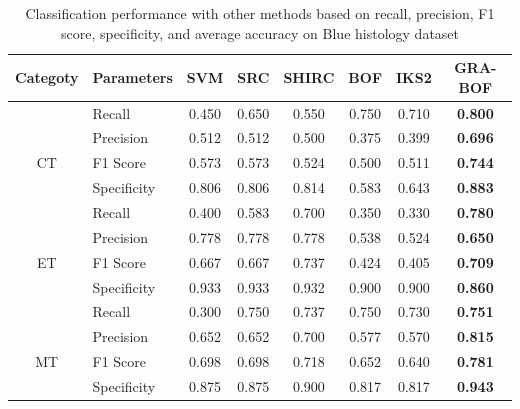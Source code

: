 \begin{table}[h]
\centering
\caption[Classification performance  with  other methods based on  recall, precision, F1 score, specificity, and average accuracy on Blue histology dataset]{\fontsize{10pt}{12pt}\selectfont Classification performance  with  other methods based on  recall, precision, F1 score, specificity, and average accuracy on Blue histology dataset}
    \label{ch5:tab:tissuep}
{\scriptsize
\renewcommand{\arraystretch}{1.2} 
\begin{tabular}{|c|l|c|c|c|c|c|c|}
\hline
Categoty    &    Parameters    &    SVM    &    SRC    &    SHIRC    &    BOF    &    IKS2    &    GRA-BOF    \\
\hline
    &    Recall    &    0.450    &    0.650    &    0.550    &    0.750    &    0.710    &    \textbf{0.800    }\\
    &    Precision    &    0.512    &    0.512    &    0.500    &    0.375    &    0.399    &    \textbf{0.696}    \\
CT    &    F1 Score     &    0.573    &    0.573    &    0.524    &    0.500    &    0.511    &    \textbf{0.744    }\\
    &    Specificity    &    0.806    &    0.806    &    0.814    &    0.583    &    0.643    &    \textbf{0.883    }\\
    \hline
    &    Recall    &    0.400    &    0.583    &    0.700    &    0.350    &    0.330    &    \textbf{0.780    }\\
    &    Precision    &    0.778    &    0.778    &    0.778    &    0.538    &    0.524    &    \textbf{0.650    }\\
ET    &    F1 Score     &    0.667    &    0.667    &    0.737    &    0.424    &    0.405    &\textbf{    0.709    }\\
    &    Specificity    &    0.933    &    0.933    &    0.932    &    0.900    &    0.900    &    \textbf{0.860}    \\
    \hline
    &    Recall    &    0.300    &    0.750    &    0.737    &    0.750    &    0.730    &\textbf{    0.751    }\\
    &    Precision    &    0.652    &    0.652    &    0.700    &    0.577    &    0.570    &    \textbf{0.815}    \\
MT    &    F1 Score     &    0.698    &    0.698    &    0.718    &    0.652    &    0.640    &    \textbf{0.781    }\\
    &    Specificity    &    0.875    &    0.875    &    0.900    &    0.817    &    0.817    &\textbf{    0.943}    \\

\end{tabular}}
\end{table}
